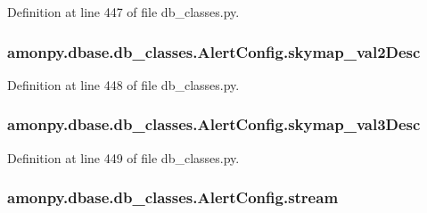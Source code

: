 Definition at line 447 of file db\-\_\-classes.\-py.

\hypertarget{classamonpy_1_1dbase_1_1db__classes_1_1_alert_config_ad123a3f944545c402b09637d5fd3068a}{
\subsubsection[{skymap\-\_\-val2\-Desc}]{\setlength{\rightskip}{0pt plus 5cm}amonpy.\-dbase.\-db\-\_\-classes.\-Alert\-Config.\-skymap\-\_\-val2\-Desc}}\label{classamonpy_1_1dbase_1_1db__classes_1_1_alert_config_ad123a3f944545c402b09637d5fd3068a}


Definition at line 448 of file db\-\_\-classes.\-py.

\hypertarget{classamonpy_1_1dbase_1_1db__classes_1_1_alert_config_a5150e8d288983b9436a2d356c33537cc}{
\subsubsection[{skymap\-\_\-val3\-Desc}]{\setlength{\rightskip}{0pt plus 5cm}amonpy.\-dbase.\-db\-\_\-classes.\-Alert\-Config.\-skymap\-\_\-val3\-Desc}}\label{classamonpy_1_1dbase_1_1db__classes_1_1_alert_config_a5150e8d288983b9436a2d356c33537cc}


Definition at line 449 of file db\-\_\-classes.\-py.

\hypertarget{classamonpy_1_1dbase_1_1db__classes_1_1_alert_config_a5181b25cd2b3960297851cac7538eeb5}{
\subsubsection[{stream}]{\setlength{\rightskip}{0pt plus 5cm}amonpy.\-dbase.\-db\-\_\-classes.\-Alert\-Config.\-stream}}\label{classamonpy_1_1dbase_1_1db__classes_1_1_alert_config_a5181b25cd2b3960297851cac7538eeb5}


